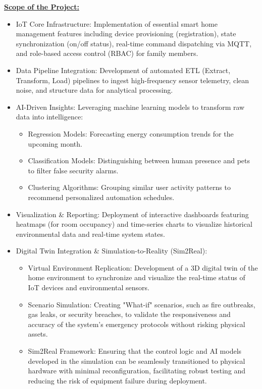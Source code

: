 \underline{\textbf{Scope of the Project:}}
\begin{itemize}
  \item IoT Core Infrastructure:
    Implementation of essential smart home management features including device provisioning (registration), state synchronization (on/off status), real-time command dispatching via MQTT, and role-based access control (RBAC) for family members.

  \item Data Pipeline Integration:
    Development of automated ETL (Extract, Transform, Load) pipelines to ingest high-frequency sensor telemetry, clean noise, and structure data for analytical processing.

  \item AI-Driven Insights:
    Leveraging machine learning models to transform raw data into intelligence:
    \begin{itemize}
      \item Regression Models: Forecasting energy consumption trends for the upcoming month.
      \item Classification Models: Distinguishing between human presence and pets to filter false security alarms.
      \item Clustering Algorithms: Grouping similar user activity patterns to recommend personalized automation schedules.
    \end{itemize}

  \item Visualization \& Reporting:
    Deployment of interactive dashboards featuring heatmaps (for room occupancy) and time-series charts to visualize historical environmental data and real-time system states.

  \item Digital Twin Integration \& Simulation-to-Reality (Sim2Real):
    \begin{itemize}
      \item Virtual Environment Replication: Development of a 3D digital twin of the home environment to synchronize and visualize the real-time status of IoT devices and environmental sensors.
      \item Scenario Simulation: Creating "What-if" scenarios, such as fire outbreaks, gas leaks, or security breaches, to validate the responsiveness and accuracy of the system's emergency protocols without risking physical assets.
      \item Sim2Real Framework: Ensuring that the control logic and AI models developed in the simulation can be seamlessly transitioned to physical hardware with minimal reconfiguration, facilitating robust testing and reducing the risk of equipment failure during deployment.
    \end{itemize}


\end{itemize}

